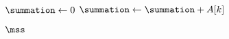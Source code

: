 
\begin{algorithm}[H]
  \begin{algorithmic}[1]
      \State {}

      \hStatex
          \State $\summation \gets 0$
            \State $\summation \gets \summation + A[k]$
          \EndFor
          \State \red{$\mss \gets \max \set{\mss, \summation}$}
        \EndFor
      \EndFor

      \hStatex 
      \State \Return $\mss$
    \EndProcedure
  \end{algorithmic}
\end{algorithm}